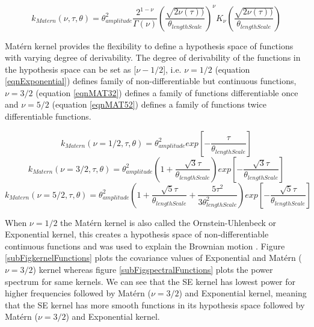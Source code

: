 \begin{equation}
k_{Matern}(\nu, \tau, \theta) = \theta_{amplitude}^2\frac{2^{1- \nu }}{\Gamma (\nu)}\left ( \frac{\sqrt{2\nu(\tau))}}{\theta_{lengthScale}} \right )^{\nu}K_{\nu}\left ( \frac{\sqrt{2\nu(\tau))}}{\theta_{lengthScale}} \right)
\end{equation}

Mat\'ern kernel provides the flexibility to define a hypothesis space of functions with varying degree of derivability. The degree of derivability of the functions in the hypothesis space can be set as [\(\nu-1/2\)], i.e.  $\nu = 1/2$ (equation \ref{eqnExponential}) defines family of non-differentiable but continuous functions, $\nu = 3/2$ (equation \ref{eqnMAT32}) defines a family of functions differentiable once and $\nu = 5/2$ (equation \ref{eqnMAT52}) defines a family of functions twice differentiable functions.

\begin{equation}\label{eqnExponential}
k_{Matern}(\nu = 1/2, \tau, \theta) = \theta_{amplitude}^2exp[-\frac{\tau}{\theta_{lengthScale}}]
\end{equation}
\begin{equation}\label{eqnMAT32}
k_{Matern}(\nu = 3/2, \tau, \theta) = \theta_{amplitude}^2 (1 + \frac{\sqrt{3}\tau}{\theta_{lengthScale}}) exp[-\frac{\sqrt{3}\tau}{\theta_{lengthScale}}]
\end{equation}
\begin{equation}\label{eqnMAT52}
k_{Matern}(\nu = 5/2, \tau, \theta) = \theta_{amplitude}^2(1 + \frac{\sqrt{5}\tau}{\theta_{lengthScale}} + \frac{5\tau^2}{3\theta_{lengthScale}^2})
exp[-\frac{\sqrt{5}\tau}{\theta_{lengthScale}}]
\end{equation}

When \(\nu = 1/2\) the Mat\'ern kernel is also called the Ornstein-Uhlenbeck or Exponential kernel, this creates a hypothesis space of non-differentiable continuous functions and was used to explain the Brownian motion \cite{uhlenbeck1930theory}. Figure \ref{subFigkernelFunctions} plots the covariance values of Exponential and Mat\'ern (\(\nu=3/2\)) kernel whereas figure \ref{subFigspectralFunctions} plots the power spectrum for same kernels. We can see that the SE kernel has lowest power for higher frequencies followed by Mat\'ern (\(\nu=3/2\)) and Exponential kernel, meaning that the SE kernel has more smooth functions in its hypothesis space followed by Mat\'ern (\(\nu=3/2\)) and Exponential kernel. 

